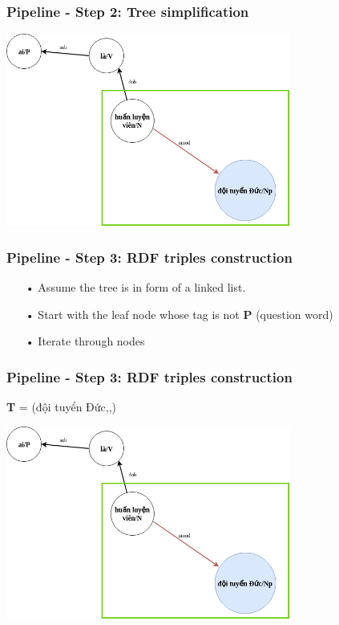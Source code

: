 \documentclass{beamer}
\begin{document}
\begin{frame}
	\frametitle{Pipeline - Step 2: Tree simplification}
	
	\begin{center} 
		\centering 
			\includegraphics[width=0.7\textwidth,height=0.7\textheight,keepaspectratio]{firstextreesimplified3}
			\vspace{0.5cm} 
	\end{center}
		
\end{frame}


\begin{frame}
	\frametitle{Pipeline - Step 3: RDF triples construction}
	
	\begin{itemize}
		
		\item[•] Assume the tree is in form of a linked list.
		\item[•] Start with the leaf node whose tag is not \textbf{P} (question word)
		\item[•] Iterate through nodes 
		
	\end{itemize}
		
\end{frame}

\begin{frame}
	\frametitle{Pipeline - Step 3: RDF triples construction}
	\textbf{T} = (đội tuyển Đức,,)
	\begin{center} 
		\centering 
			\includegraphics[width=0.7\textwidth,height=0.7\textheight,keepaspectratio]			{firstextreesimplified3}
			\vspace{0.5cm} 
	\end{center}	
	
	
		
\end{frame}
\end{document}
